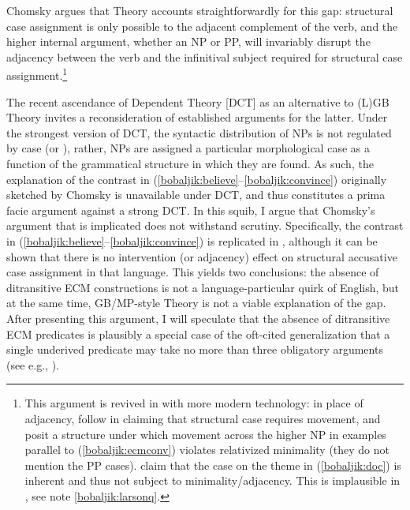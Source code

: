 \documentclass[output=paper]{langsci/langscibook}
\begin{document}
\begin{exe}
\label{bobaljik:convleo}
 \label{bobaljik:leobel}
\end{exe}

\noindent Chomsky argues that  Theory accounts straightforwardly for this gap: structural case assignment is only possible to the adjacent complement of the verb, and the higher internal argument, whether an NP or PP, will invariably disrupt the adjacency between the verb and the infinitival subject required for structural case assignment.\footnote{This argument is revived in  \citet{Boehorn2005} with more modern technology: in place of adjacency, \citet{Boehorn2005} follow \citet{Boskovic2002} in claiming that structural case requires movement, and posit a structure under which movement across the higher NP in examples parallel to (\ref{bobaljik:ecmconv}) violates relativized minimality (they do not mention the PP cases). \citet{Boehorn2005} claim that the case on the theme in (\ref{bobaljik:doc}) is inherent and thus not subject to minimality/adjacency. This is implausible in , see note \ref{bobaljik:larsonq}.} 

\largerpage
The recent ascendance of Dependent  Theory {[DCT]} \citep{Marantz1991,Baker2015} as an alternative to (L)GB  Theory invites a reconsideration of established arguments for the latter. Under the strongest version of DCT, the syntactic distribution of NPs is not regulated by case (or ), rather, NPs are assigned a particular morphological case as a function of the grammatical structure in which they are found. As such, the explanation of the contrast in (\ref{bobaljik:believe}--\ref{bobaljik:convince}) originally sketched by Chomsky is unavailable under DCT, and thus constitutes a prima facie argument against a strong DCT. In this squib, I argue that Chomsky's argument that  is implicated does not withstand scrutiny. Specifically, the contrast in (\ref{bobaljik:believe}--\ref{bobaljik:convince}) is replicated in , although it can be shown that there is no intervention (or adjacency) effect on structural accusative case assignment in that language. This yields two conclusions: the absence of ditransitive ECM constructions is not a language-particular quirk of English, but at the same time, GB/MP-style  Theory is not a viable explanation of the gap. After presenting this argument, I will speculate that the absence of ditransitive ECM predicates is plausibly a special case of the oft-cited generalization that a single underived predicate may take no more than three obligatory arguments (see e.g., \citealt{Pesetsky1995}).
\end{document}
